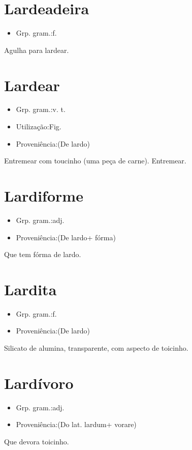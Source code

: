 \section{Lardeadeira}
\begin{itemize}
\item {Grp. gram.:f.}
\end{itemize}
Agulha para lardear.
\section{Lardear}
\begin{itemize}
\item {Grp. gram.:v. t.}
\end{itemize}
\begin{itemize}
\item {Utilização:Fig.}
\end{itemize}
\begin{itemize}
\item {Proveniência:(De \textunderscore lardo\textunderscore )}
\end{itemize}
Entremear com toucinho (uma peça de carne).
Entremear.
\section{Lardiforme}
\begin{itemize}
\item {Grp. gram.:adj.}
\end{itemize}
\begin{itemize}
\item {Proveniência:(De \textunderscore lardo\textunderscore  + \textunderscore fórma\textunderscore )}
\end{itemize}
Que tem fórma de lardo.
\section{Lardita}
\begin{itemize}
\item {Grp. gram.:f.}
\end{itemize}
\begin{itemize}
\item {Proveniência:(De \textunderscore lardo\textunderscore )}
\end{itemize}
Silicato de alumina, transparente, com aspecto de toicinho.
\section{Lardívoro}
\begin{itemize}
\item {Grp. gram.:adj.}
\end{itemize}
\begin{itemize}
\item {Proveniência:(Do lat. \textunderscore lardum\textunderscore  + \textunderscore vorare\textunderscore )}
\end{itemize}
Que devora toicinho.
